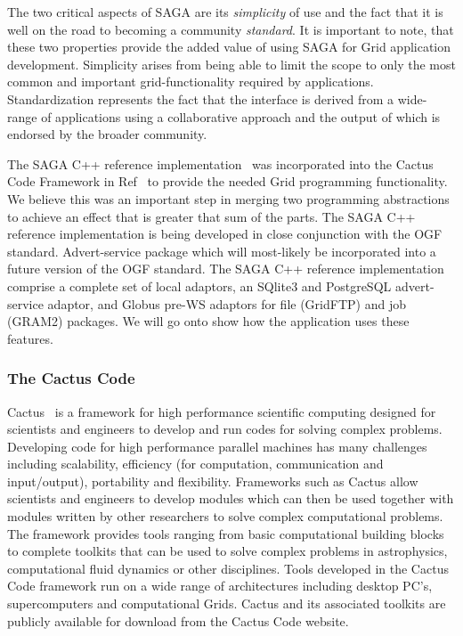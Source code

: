 \documentclass[conference,final]{IEEEtran}
\begin{document}
The two critical aspects of SAGA are its {\it simplicity} of use and
the fact that it is well on the road to becoming a community {\it
  standard}.  It is important to note, that these two properties
provide the added value of using SAGA for Grid application
development.  Simplicity arises from being able to limit the scope to
only the most common and important grid-functionality required by
applications.  Standardization represents the fact that the interface
is derived from a wide-range of applications using a collaborative
approach and the output of which is endorsed by the broader community.

The SAGA C++ reference implementation~\cite{saga_web} was incorporated
into the Cactus Code Framework in Ref~\cite{escience07} to provide the
needed Grid programming functionality.  We believe this was an
important step in merging two programming abstractions to achieve an
effect that is greater that sum of the parts.  The SAGA C++ reference
implementation is being developed in close conjunction with the OGF
standard.  Advert-service package which will most-likely be
incorporated into a future version of the OGF standard.  The SAGA C++
reference implementation comprise a complete set of local adaptors, an
SQlite3 and PostgreSQL advert-service adaptor, and Globus pre-WS
adaptors for file (GridFTP) and job (GRAM2) packages. We will go onto
show how the application uses these features.

\subsubsection{The Cactus Code~\cite{cactus_web}}

Cactus~\cite{X0} is a framework for high performance scientific
computing designed for scientists and engineers to develop and run
codes for solving complex problems.  Developing code for high
performance parallel machines has many challenges including
scalability, efficiency (for computation, communication and
input/output), portability and flexibility. Frameworks such as Cactus
allow scientists and engineers to develop modules which can then be
used together with modules written by other researchers to solve
complex computational problems. The framework provides tools ranging
from basic computational building blocks to complete toolkits that can
be used to solve complex problems in astrophysics, computational fluid
dynamics or other disciplines.  Tools developed in the Cactus Code
framework run on a wide range of architectures including desktop PC's,
supercomputers and computational Grids. Cactus and its associated
toolkits are publicly available for download from the Cactus Code
website.
\end{document}
